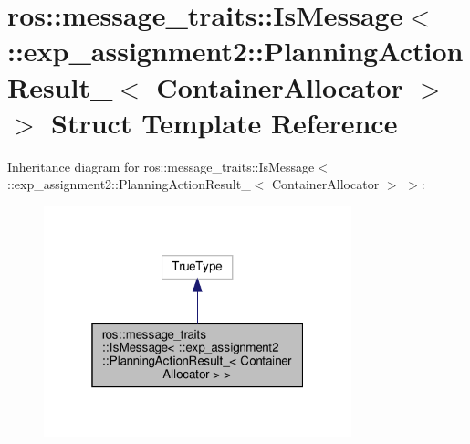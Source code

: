 \hypertarget{structros_1_1message__traits_1_1IsMessage_3_01_1_1exp__assignment2_1_1PlanningActionResult___3_01ContainerAllocator_01_4_01_4}{}\section{ros\+:\+:message\+\_\+traits\+:\+:Is\+Message$<$ \+:\+:exp\+\_\+assignment2\+:\+:Planning\+Action\+Result\+\_\+$<$ Container\+Allocator $>$ $>$ Struct Template Reference}
\label{structros_1_1message__traits_1_1IsMessage_3_01_1_1exp__assignment2_1_1PlanningActionResult___3_01ContainerAllocator_01_4_01_4}


Inheritance diagram for ros\+:\+:message\+\_\+traits\+:\+:Is\+Message$<$ \+:\+:exp\+\_\+assignment2\+:\+:Planning\+Action\+Result\+\_\+$<$ Container\+Allocator $>$ $>$\+:
\nopagebreak
\begin{figure}[H]
\begin{center}
\leavevmode
\includegraphics[width=253pt]{structros_1_1message__traits_1_1IsMessage_3_01_1_1exp__assignment2_1_1PlanningActionResult___3_03e7668510e62aa0b28641068d2774d9c}
\end{center}
\end{figure}


